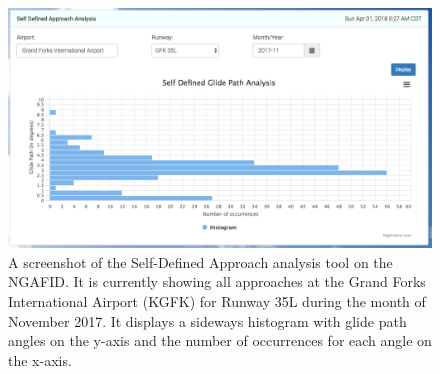     	\begin{figure}
    		\centering
            \includegraphics[width=\linewidth]{img/self_defined_screenshot}
            \caption{A screenshot of the Self-Defined Approach analysis tool on the NGAFID.  It is currently showing all approaches at the Grand Forks International Airport (KGFK) for Runway 35L during the month of November 2017.  It displays a sideways histogram with glide path angles on the y-axis and the number of occurrences for each angle on the x-axis.}
            \label{fig:self_defined_screenshot}
    	\end{figure}


